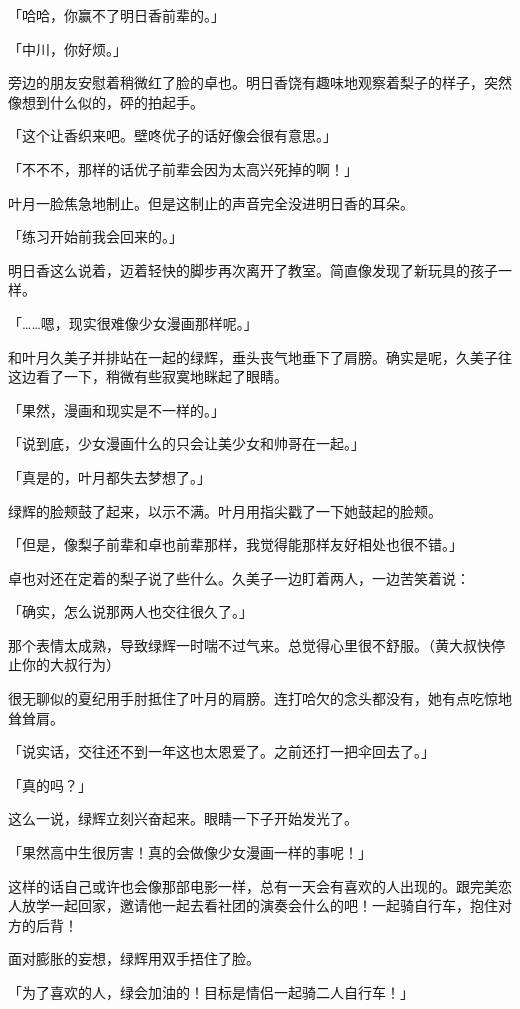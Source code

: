 \documentclass[UTF8]{ctexart}
\begin{document}
    「哈哈，你赢不了明日香前辈的。」

    「中川，你好烦。」

    旁边的朋友安慰着稍微红了脸的卓也。明日香饶有趣味地观察着梨子的样子，突然像想到什么似的，砰的拍起手。

    「这个让香织来吧。壁咚优子的话好像会很有意思。」

    「不不不，那样的话优子前辈会因为太高兴死掉的啊！」

    叶月一脸焦急地制止。但是这制止的声音完全没进明日香的耳朵。

    「练习开始前我会回来的。」

    明日香这么说着，迈着轻快的脚步再次离开了教室。简直像发现了新玩具的孩子一样。

    「……嗯，现实很难像少女漫画那样呢。」

    和叶月久美子并排站在一起的绿辉，垂头丧气地垂下了肩膀。确实是呢，久美子往这边看了一下，稍微有些寂寞地眯起了眼睛。

    「果然，漫画和现实是不一样的。」

    「说到底，少女漫画什么的只会让美少女和帅哥在一起。」

    「真是的，叶月都失去梦想了。」

    绿辉的脸颊鼓了起来，以示不满。叶月用指尖戳了一下她鼓起的脸颊。

    「但是，像梨子前辈和卓也前辈那样，我觉得能那样友好相处也很不错。」

    卓也对还在定着的梨子说了些什么。久美子一边盯着两人，一边苦笑着说：

    「确实，怎么说那两人也交往很久了。」

    那个表情太成熟，导致绿辉一时喘不过气来。总觉得心里很不舒服。（黄大叔快停止你的大叔行为）

    很无聊似的夏纪用手肘抵住了叶月的肩膀。连打哈欠的念头都没有，她有点吃惊地耸耸肩。

    「说实话，交往还不到一年这也太恩爱了。之前还打一把伞回去了。」

    「真的吗？」

    这么一说，绿辉立刻兴奋起来。眼睛一下子开始发光了。

    「果然高中生很厉害！真的会做像少女漫画一样的事呢！」

    这样的话自己或许也会像那部电影一样，总有一天会有喜欢的人出现的。跟完美恋人放学一起回家，邀请他一起去看社团的演奏会什么的吧！一起骑自行车，抱住对方的后背！

    面对膨胀的妄想，绿辉用双手捂住了脸。

    「为了喜欢的人，绿会加油的！目标是情侣一起骑二人自行车！」
\end{document}
